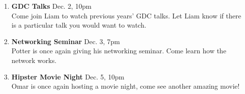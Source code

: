 \documentclass[9pt]{extarticle} %
\begin{document}
\begin{minipage}[t]{.35\linewidth}
\begin{mdframed}[style=sidebar,frametitle={}]
\begin{enumerate}[leftmargin=0.2cm]
\item \textbf{GDC Talks} Dec. 2, 10pm \\
	Come join Liam to watch previous years' GDC talks. Let Liam know
	if there is a particular talk you would want to watch. \\

\item \textbf{Networking Seminar} Dec. 3, 7pm \\
	Potter is once again giving his networking seminar. Come learn how
	the network works. \\
	
\item \textbf{Hipster Movie Night} Dec. 5, 10pm \\
	Omar is once again hosting a movie night, come see another amazing
	movie! \\
\end{enumerate}





\end{mdframed}
\end{minipage}\hfill %
%
%
\end{document}
